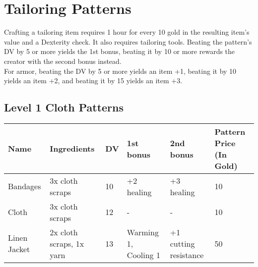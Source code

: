 \section{Tailoring Patterns}\label{sec:tailoringPatterns}
Crafting a tailoring item requires 1 hour for every 10 gold in the resulting item's value and a Dexterity check.
It also requires tailoring tools.
Beating the pattern's DV by 5 or more yields the 1st bonus, beating it by 10 or more rewards the creator with the second bonus instead.\\
For armor, beating the DV by 5 or more yields an item +1, beating it by 10 yields an item +2, and beating it by 15 yields an item +3.\\
	
\subsection{Level 1 Cloth Patterns}
\begin{longtable}{p{1.5cm} | p{2.5cm} | l | p{2cm} | p{2cm} | p{1cm} }
	Name & Ingredients & DV  & 1st bonus & 2nd bonus & Pattern Price (In Gold)\\ \hline
	Bandages & 3x cloth scraps & 10 & +2 healing & +3 healing & 10\\
	Cloth & 3x cloth scraps & 12 & - & - & 10\\
	Linen Jacket & 2x cloth scraps, 1x yarn & 13 & Warming 1, Cooling 1 & +1 cutting resistance & 50\\
\end{longtable}
%
%
%
%
%
%
%
%
